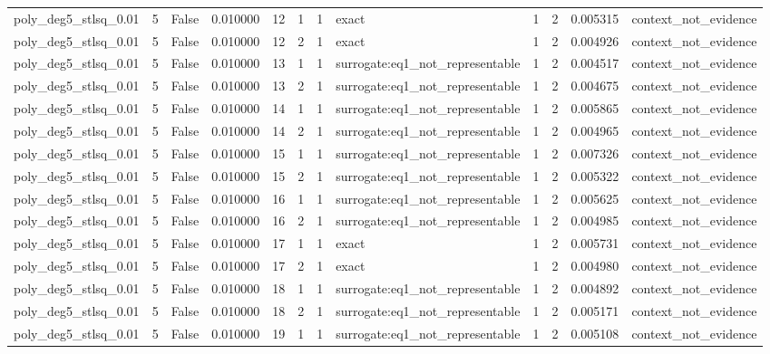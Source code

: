 \begin{tabular}{lrrrrrrlrrrl}
poly\_deg5\_stlsq\_0.01 & 5 & False & 0.010000 & 12 & 1 & 1 & exact & 1 & 2 & 0.005315 & context\_not\_evidence \\
poly\_deg5\_stlsq\_0.01 & 5 & False & 0.010000 & 12 & 2 & 1 & exact & 1 & 2 & 0.004926 & context\_not\_evidence \\
poly\_deg5\_stlsq\_0.01 & 5 & False & 0.010000 & 13 & 1 & 1 & surrogate:eq1\_not\_representable & 1 & 2 & 0.004517 & context\_not\_evidence \\
poly\_deg5\_stlsq\_0.01 & 5 & False & 0.010000 & 13 & 2 & 1 & surrogate:eq1\_not\_representable & 1 & 2 & 0.004675 & context\_not\_evidence \\
poly\_deg5\_stlsq\_0.01 & 5 & False & 0.010000 & 14 & 1 & 1 & surrogate:eq1\_not\_representable & 1 & 2 & 0.005865 & context\_not\_evidence \\
poly\_deg5\_stlsq\_0.01 & 5 & False & 0.010000 & 14 & 2 & 1 & surrogate:eq1\_not\_representable & 1 & 2 & 0.004965 & context\_not\_evidence \\
poly\_deg5\_stlsq\_0.01 & 5 & False & 0.010000 & 15 & 1 & 1 & surrogate:eq1\_not\_representable & 1 & 2 & 0.007326 & context\_not\_evidence \\
poly\_deg5\_stlsq\_0.01 & 5 & False & 0.010000 & 15 & 2 & 1 & surrogate:eq1\_not\_representable & 1 & 2 & 0.005322 & context\_not\_evidence \\
poly\_deg5\_stlsq\_0.01 & 5 & False & 0.010000 & 16 & 1 & 1 & surrogate:eq1\_not\_representable & 1 & 2 & 0.005625 & context\_not\_evidence \\
poly\_deg5\_stlsq\_0.01 & 5 & False & 0.010000 & 16 & 2 & 1 & surrogate:eq1\_not\_representable & 1 & 2 & 0.004985 & context\_not\_evidence \\
poly\_deg5\_stlsq\_0.01 & 5 & False & 0.010000 & 17 & 1 & 1 & exact & 1 & 2 & 0.005731 & context\_not\_evidence \\
poly\_deg5\_stlsq\_0.01 & 5 & False & 0.010000 & 17 & 2 & 1 & exact & 1 & 2 & 0.004980 & context\_not\_evidence \\
poly\_deg5\_stlsq\_0.01 & 5 & False & 0.010000 & 18 & 1 & 1 & surrogate:eq1\_not\_representable & 1 & 2 & 0.004892 & context\_not\_evidence \\
poly\_deg5\_stlsq\_0.01 & 5 & False & 0.010000 & 18 & 2 & 1 & surrogate:eq1\_not\_representable & 1 & 2 & 0.005171 & context\_not\_evidence \\
poly\_deg5\_stlsq\_0.01 & 5 & False & 0.010000 & 19 & 1 & 1 & surrogate:eq1\_not\_representable & 1 & 2 & 0.005108 & context\_not\_evidence \\

\end{tabular}
